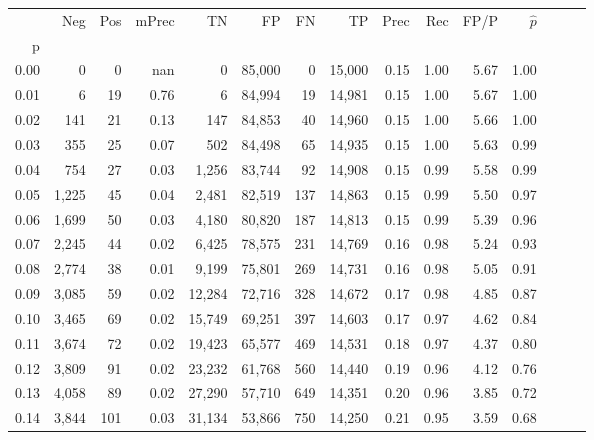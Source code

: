 \begin{tabular}{rrrrrrrrrrrrrrr}
\toprule
{} &    Neg &  Pos & mPrec &      TN &      FP &      FN &      TP &  Prec &   Rec &  FP/P & $\hat{p}$ \\
p    &        &      &       &         &         &         &         &       &       &       &           \\
\midrule
0.00 &      0 &    0 &   nan &       0 &  85,000 &       0 &  15,000 &  0.15 &  1.00 &  5.67 &      1.00 \\
0.01 &      6 &   19 &  0.76 &       6 &  84,994 &      19 &  14,981 &  0.15 &  1.00 &  5.67 &      1.00 \\
0.02 &    141 &   21 &  0.13 &     147 &  84,853 &      40 &  14,960 &  0.15 &  1.00 &  5.66 &      1.00 \\
0.03 &    355 &   25 &  0.07 &     502 &  84,498 &      65 &  14,935 &  0.15 &  1.00 &  5.63 &      0.99 \\
0.04 &    754 &   27 &  0.03 &   1,256 &  83,744 &      92 &  14,908 &  0.15 &  0.99 &  5.58 &      0.99 \\
0.05 &  1,225 &   45 &  0.04 &   2,481 &  82,519 &     137 &  14,863 &  0.15 &  0.99 &  5.50 &      0.97 \\
0.06 &  1,699 &   50 &  0.03 &   4,180 &  80,820 &     187 &  14,813 &  0.15 &  0.99 &  5.39 &      0.96 \\
0.07 &  2,245 &   44 &  0.02 &   6,425 &  78,575 &     231 &  14,769 &  0.16 &  0.98 &  5.24 &      0.93 \\
0.08 &  2,774 &   38 &  0.01 &   9,199 &  75,801 &     269 &  14,731 &  0.16 &  0.98 &  5.05 &      0.91 \\
0.09 &  3,085 &   59 &  0.02 &  12,284 &  72,716 &     328 &  14,672 &  0.17 &  0.98 &  4.85 &      0.87 \\
0.10 &  3,465 &   69 &  0.02 &  15,749 &  69,251 &     397 &  14,603 &  0.17 &  0.97 &  4.62 &      0.84 \\
0.11 &  3,674 &   72 &  0.02 &  19,423 &  65,577 &     469 &  14,531 &  0.18 &  0.97 &  4.37 &      0.80 \\
0.12 &  3,809 &   91 &  0.02 &  23,232 &  61,768 &     560 &  14,440 &  0.19 &  0.96 &  4.12 &      0.76 \\
0.13 &  4,058 &   89 &  0.02 &  27,290 &  57,710 &     649 &  14,351 &  0.20 &  0.96 &  3.85 &      0.72 \\
0.14 &  3,844 &  101 &  0.03 &  31,134 &  53,866 &     750 &  14,250 &  0.21 &  0.95 &  3.59 &      0.68 \\

\end{tabular}
